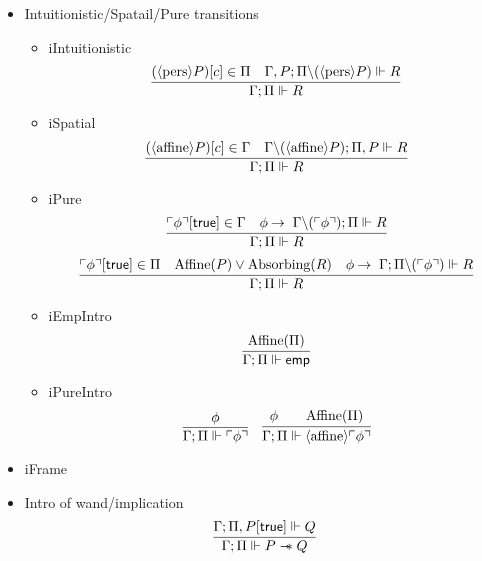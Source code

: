 {\begin{itemize}
  Ex falso
  \[
  \infer{\entailsD P}
        {\entailsD \bot}
  \]
\item Intuitionistic/Spatail/Pure transitions
  \begin{itemize}
  \item iIntuitionistic
    \[
    \infer{\entailsD R}
          {(\pers P)[c] \in \SpatD &
           \entails {\IntuD, P} {\SpatD \backslash (\pers P)} {R}
         }
    \]
  \item iSpatial
    \[
    \infer{\entailsD R}
          {(\affine P)[c] \in \IntuD &
           \entails {\IntuD \backslash (\affine P)} {\SpatD, P} {R}
         }
    \]
  \item iPure
    \[
    \infer{\entailsD R}
          {\pure{\phi}[\true] \in \IntuD &
           \phi \imp \entails {\IntuD \backslash (\pure{\phi})} {\SpatD} {R}
         }
    \]
    \[
    \infer{\entailsD R}
          {\pure{\phi}[\true] \in \SpatD &
           \Affine{P} \vee \Absorbing{R} &
           \phi \imp \entails {\IntuD} {\SpatD \backslash (\pure{\phi})} {R}
         }
    \]
  \item iEmpIntro
    \[
    \infer{\entailsD \emp}
          {\Affine{\SpatD}}
    \]
  \item iPureIntro
    \begin{equation}
    \infer{\entailsD {\pure \phi}}
          {\phi}
    \quad
    \infer{\entailsD {\affine \pure \phi }}
          {\phi & &
           \Affine{\SpatD}
          }
    \end{equation}
  \end{itemize}
\item iFrame
\item Intro of wand/implication
  \[
  \infer{\entailsD P \wand Q}
        {\entails {\IntuD} {\SpatD , P[\true]} {Q}}
  \]


\end{itemize}}
